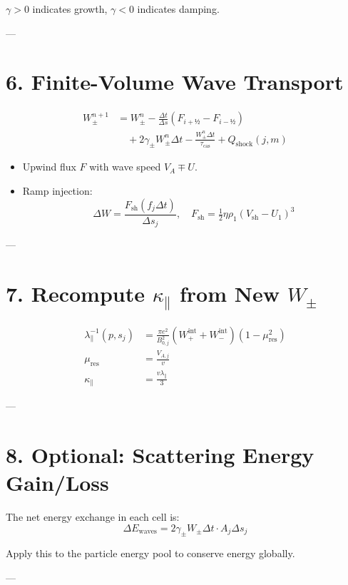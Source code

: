 $\gamma > 0$ indicates growth, $\gamma < 0$ indicates damping.

---

\section*{6. Finite-Volume Wave Transport}

\begin{align*}
W_\pm^{n+1} &= W_\pm^n
- \frac{\Delta t}{\Delta s} (F_{i+½} - F_{i-½}) \\
&\quad + 2 \gamma_\pm W_\pm^n \Delta t
- \frac{W_\pm^n \Delta t}{\tau_{\text{cas}}}
+ Q_{\text{shock}}(j,m)
\end{align*}

\begin{itemize}
    \item Upwind flux $F$ with wave speed $V_A \mp U$.
    \item Ramp injection:
    \[
    \Delta W = \frac{F_{\text{sh}} (f_j \Delta t)}{\Delta s_j}, \quad 
    F_{\text{sh}} = \tfrac{1}{2} \eta \rho_1 (V_{\text{sh}} - U_1)^3
    \]
\end{itemize}

---

\section*{7. Recompute $\kappa_\parallel$ from New $W_\pm$}

\begin{align}
\lambda_\parallel^{-1}(p,s_j) &=
\frac{\pi e^2}{B_{0,j}^2} \left(W_+^{\text{int}} + W_-^{\text{int}}\right)
(1 - \mu_{\text{res}}^2) \\
\mu_{\text{res}} &= \frac{V_{A,j}}{v} \\
\kappa_\parallel &= \frac{v \lambda_\parallel}{3}
\end{align}

---

\section*{8. Optional: Scattering Energy Gain/Loss}

The net energy exchange in each cell is:
\[
\Delta E_{\text{waves}} = 2 \gamma_\pm W_\pm \Delta t \cdot A_j \Delta s_j
\]

Apply this to the particle energy pool to conserve energy globally.

---


